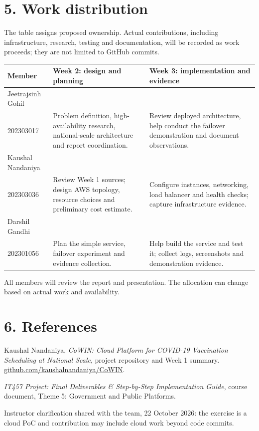 \documentclass[11pt,a4paper]{article}
\newcommand{\sectionline}[1]{\section*{\color{navy}#1}}
\begin{document}
\sectionline{5. Work distribution}
The table assigns proposed ownership. Actual contributions, including infrastructure, research, testing and documentation, will be recorded as work proceeds; they are not limited to GitHub commits.

\small
\begin{tabularx}{\textwidth}{@{}p{31mm}YY@{}}\toprule
\textbf{Member} & \textbf{Week 2: design and planning} & \textbf{Week 3: implementation and evidence}\\\midrule
Jeetrajsinh Gohil\\202303017 & Problem definition, high-availability research, national-scale architecture and report coordination. & Review deployed architecture, help conduct the failover demonstration and document observations.\\\addlinespace
Kaushal Nandaniya\\202303036 & Review Week 1 sources; design AWS topology, resource choices and preliminary cost estimate. & Configure instances, networking, load balancer and health checks; capture infrastructure evidence.\\\addlinespace
Darshil Gandhi\\202301056 & Plan the simple service, failover experiment and evidence collection. & Help build the service and test it; collect logs, screenshots and demonstration evidence.\\\bottomrule
\end{tabularx}
\normalsize
All members will review the report and presentation. The allocation can change based on actual work and availability.
\sectionline{6. References}
\begin{enumerate}[label={[\arabic*]}]
\item Kaushal Nandaniya, \textit{CoWIN: Cloud Platform for COVID-19 Vaccination Scheduling at National Scale}, project repository and Week 1 summary. \href{https://github.com/kaushalnandaniya/CoWIN}{github.com/kaushalnandaniya/CoWIN}.
\item \textit{IT457 Project: Final Deliverables \& Step-by-Step Implementation Guide}, course document, Theme 5: Government and Public Platforms.
\item Instructor clarification shared with the team, 22 October 2026: the exercise is a cloud PoC and contribution may include cloud work beyond code commits.
\end{enumerate}
\end{document}
